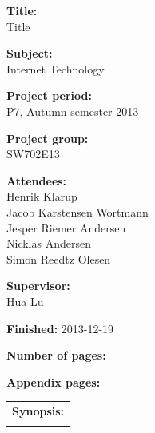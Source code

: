 \begin{titlingpage}
\begin{nopagebreak}
{\noindent\begin{minipage}[c]{0.4\textwidth}
	\begin{flushleft} 
	\begin{description}	
\item {\textbf{Title:}}\\
Title
\item {\textbf{Subject:}}\\
Internet Technology
\item {\textbf{Project period:}}\\
   P7, Autumn semester 2013\\
  \hspace{4cm}
\item {\textbf{Project group:}}\\
  SW702E13\\
  \hspace{4cm}
\item {\textbf{Attendees:}}\\
Henrik Klarup \\
Jacob Karstensen Wortmann \\
Jesper Riemer Andersen \\
Nicklas Andersen \\
Simon Reedtz Olesen \\

\item {\textbf{Supervisor:}}\\
Hua Lu \\
\end{description}

\begin{description}
\item {\textbf{Finished:}} 2013-12-19
\item {\textbf{Number of pages:}} \pageref{lastpage}
\item {\textbf{Appendix pages:}} 
\end{description}
\vfill
	\end{flushleft}
\end{minipage}
\begin{minipage}[c]{0.6\textwidth}
	\begin{flushright} 
		  \vspace{.15cm}
  \hfill 
  \begin{tabular}{l}
  {\textbf{Synopsis:}}\bigskip \\
  \fbox{
    \parbox{5.5cm}{\bigskip
     {\vfill{\small 
     \bigskip}}
     }}
   \end{tabular}
	\end{flushright}
\end{minipage}

}
\end{nopagebreak}
\end{titlingpage}
